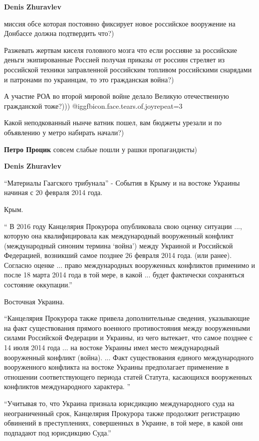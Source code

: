 \begin{itemize}
\begin{itemize}
\textbf{Denis Zhuravlev} 

миссия обсе которая постоянно фиксирует новое российское вооружение на Донбассе
должна подтвердить что?)

Разжевать жертвам киселя головного мозга что если россияне за российские деньги
экипированные Россией получая приказы от россиян стреляет из российской техники
заправленной российским топливом российскими снарядами и патронами по
украинцам, то это гражданская война?)

А участие РОА во второй мировой войне делало Великую отечественную гражданской
тоже?)))  @igg{fbicon.face.tears.of.joy}{repeat=3} 

Какой неподкованный нынче ватник пошел, вам бюджеты урезали и по объявлению у
метро набирать начали?)


\textbf{Петро Процик} совсем слабые пошли у рашки пропагандисты)

\textbf{Denis Zhuravlev}

\enquote{Материалы Гаагского трибунала} - События в Крыму и на востоке Украины
начиная с 20 февраля 2014 года.

Крым.

\enquote{ В 2016 году Канцелярия Прокурора опубликовала свою оценку ситуации ...,
которую она квалифицировала как международный вооруженный конфликт
(международный синоним термина \enquote{война}) между Украиной и Российской Федерацией,
возникший самое позднее 26 февраля 2014 года. (или ранее). Согласно оценке ...
право международных вооруженных конфликтов применимо и после 18 марта 2014 года
в той мере, в какой ... будет фактически сохраняться состояние оккупации.}

Восточная Украина.

\enquote{Канцелярия Прокурора также привела дополнительные сведения, указывающие на
факт существования прямого военного противостояния между вооруженными силами
Российской Федерации и Украины, из чего вытекает, что самое позднее с 14 июля
2014 года ... на востоке Украины имел место международный вооруженный конфликт
(война). ...
Факт существования единого международного вооруженного конфликта на востоке
Украины предполагает применение в отношении соответствующего периода статей
Статута, касающихся вооруженных конфликтов международного характера. }

\enquote{Учитывая то, что Украина признала юрисдикцию международного суда на
неограниченный срок, Канцелярия Прокурора также продолжит регистрацию обвинений
в преступлениях, совершенных в Украине, в той мере, в какой они подпадают под
юрисдикцию Суда.}


\end{itemize}
\end{itemize}
